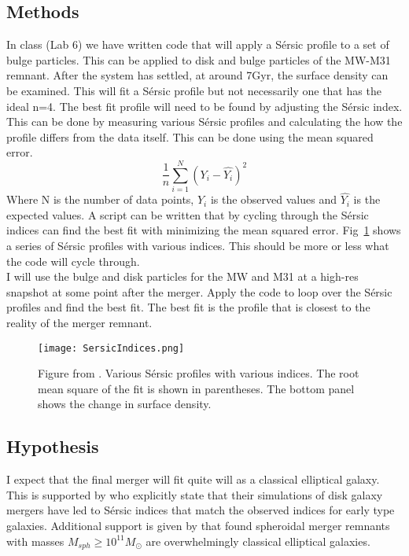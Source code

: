 \documentclass[fleqn,usenatbib]{mnras}
\begin{document}
\subsection{Methods}
In class (Lab 6) we have written code that will apply a S\'ersic profile to a set of bulge particles. This can be applied to disk and bulge particles of the MW-M31 remnant. After the system has settled, at around 7Gyr, the surface density can be examined. This will fit a S\'ersic profile but not necessarily one that has the ideal n=4. The best fit profile will need to be found by adjusting the S\'ersic index. This can be done by measuring various S\'ersic profiles and calculating the how the profile differs from the data itself. This can be done using the mean squared error. 
\begin{equation}
 \frac{1}{n}\sum_{i=1}^{N}{(Y_i - \hat{Y_i})^2}
\end{equation}
Where N is the number of data points, $Y_i$ is the observed values and $\hat{Y_i}$ is the expected values. A script can be written that by cycling through the S\'ersic indices can find the best fit with minimizing the mean squared error. Fig~\ref{fig:ProfileFits} shows a series of S\'ersic profiles with various indices. This should be more or less what the code will cycle through.\\
I will use the bulge and disk particles for the MW and M31 at a high-res snapshot at some point after the merger. Apply the code to loop over the S\'ersic profiles and find the best fit. The best fit is the profile that is closest to the reality of the merger remnant.  
\begin{figure}
	\texttt{[image: SersicIndices.png]}
    \caption{Figure from \citet{Aveves2006}. Various S\'ersic profiles with various indices. The root mean square of the fit is shown in parentheses. The bottom panel shows the change in surface density.}
    \label{fig:ProfileFits}
\end{figure}

\subsection{Hypothesis}
I expect that the final merger will fit quite will as a classical elliptical galaxy. This is supported by \citet{Aveves2006} who explicitly state that their simulations of disk galaxy mergers have led to S\'ersic indices that match the observed indices for early type galaxies. Additional support is given by \citet{Hopkins2008} that found spheroidal merger remnants with masses $M_{sph}\ge10^{11} M_{\odot}$ are overwhelmingly classical elliptical galaxies. 
\end{document}
